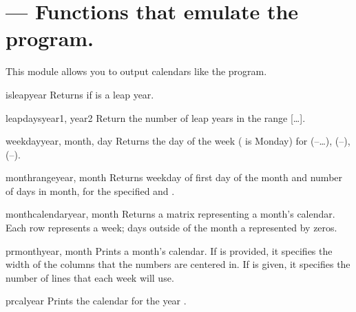 
\section{ ---
         Functions that emulate the \UNIX{}  program.}



This module allows you to output calendars like the \UNIX{}
 program.

\begin{funcdesc}{isleap}{year}
Returns  if  is a leap year.
\end{funcdesc}

\begin{funcdesc}{leapdays}{year1, year2}
Return the number of leap years in the range
[\ldots{}].
\end{funcdesc}

\begin{funcdesc}{weekday}{year, month, day}
Returns the day of the week ( is Monday) for 
(--\ldots),  (--), 
(--).
\end{funcdesc}

\begin{funcdesc}{monthrange}{year, month}
Returns weekday of first day of the month and number of days in month, 
for the specified  and .
\end{funcdesc}

\begin{funcdesc}{monthcalendar}{year, month}
Returns a matrix representing a month's calendar.  Each row represents
a week; days outside of the month a represented by zeros.
\end{funcdesc}

\begin{funcdesc}{prmonth}{year, month}
Prints a month's calendar.  If  is provided, it specifies
the width of the columns that the numbers are centered in.  If
 is given, it specifies the number of lines that each
week will use.
\end{funcdesc}

\begin{funcdesc}{prcal}{year}
Prints the calendar for the year .
\end{funcdesc}
